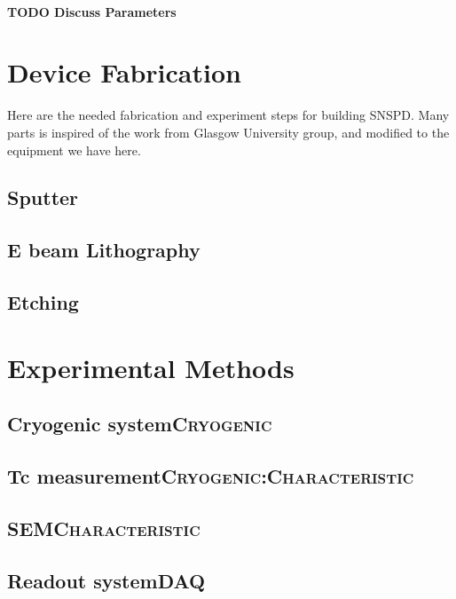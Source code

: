 \documentclass[11pt]{article}
\begin{document}
\paragraph*{{\bfseries\sffamily TODO} Discuss Parameters}
\label{sec:org48bf91e}

\section*{Device Fabrication}
\label{sec:orgc35bfb3}
Here are the needed fabrication and experiment steps for building SNSPD. Many parts is inspired of the work from Glasgow University group, and modified to the equipment we have here.
\cite{erotokritou19_next_gener_super_nanow_singl_photon_detec}

\subsection*{Sputter}
\label{sec:org684b5a1}
\subsection*{E beam Lithography}
\label{sec:orgb9bc14a}

\subsection*{Etching}
\label{sec:org85486c8}

\section*{Experimental Methods}
\label{sec:orgb2f1dd4}
\subsection*{Cryogenic system\hfill{}\textsc{Cryogenic}}
\label{sec:org3df5165}
\subsection*{Tc measurement\hfill{}\textsc{Cryogenic:Characteristic}}
\label{sec:org0338002}
\subsection*{SEM\hfill{}\textsc{Characteristic}}
\label{sec:org7eddc9e}
\subsection*{Readout system\hfill{}\textsc{DAQ}}
\label{sec:org2d89c5c}
\end{document}
